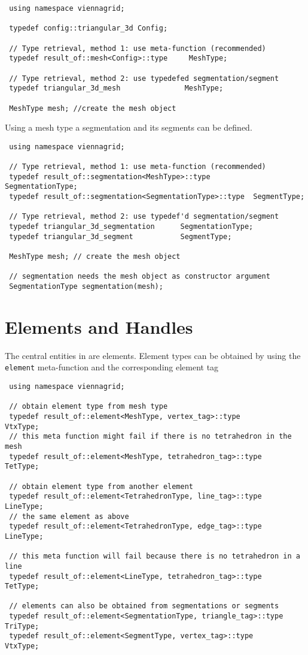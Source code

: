 \begin{lstlisting}
 using namespace viennagrid;

 typedef config::triangular_3d Config;

 // Type retrieval, method 1: use meta-function (recommended)
 typedef result_of::mesh<Config>::type     MeshType;

 // Type retrieval, method 2: use typedefed segmentation/segment
 typedef triangular_3d_mesh               MeshType;

 MeshType mesh; //create the mesh object
\end{lstlisting}

Using a mesh type a segmentation and its segments can be defined.

\begin{lstlisting}
 using namespace viennagrid;

 // Type retrieval, method 1: use meta-function (recommended)
 typedef result_of::segmentation<MeshType>::type        SegmentationType;
 typedef result_of::segmentation<SegmentationType>::type  SegmentType;

 // Type retrieval, method 2: use typedef'd segmentation/segment
 typedef triangular_3d_segmentation      SegmentationType;
 typedef triangular_3d_segment           SegmentType;

 MeshType mesh; // create the mesh object

 // segmentation needs the mesh object as constructor argument
 SegmentationType segmentation(mesh);
\end{lstlisting}

\pagebreak

\section{Elements and Handles} \label{sec:elements-and-handles}

The central entities in {\ViennaGrid} are elements. Element types can be obtained by using the \lstinline|element| meta-function and the corresponding element tag

\begin{lstlisting}
 using namespace viennagrid;

 // obtain element type from mesh type
 typedef result_of::element<MeshType, vertex_tag>::type         VtxType;
 // this meta function might fail if there is no tetrahedron in the mesh
 typedef result_of::element<MeshType, tetrahedron_tag>::type    TetType;

 // obtain element type from another element
 typedef result_of::element<TetrahedronType, line_tag>::type      LineType;
 // the same element as above
 typedef result_of::element<TetrahedronType, edge_tag>::type      LineType;

 // this meta function will fail because there is no tetrahedron in a line
 typedef result_of::element<LineType, tetrahedron_tag>::type      TetType;

 // elements can also be obtained from segmentations or segments
 typedef result_of::element<SegmentationType, triangle_tag>::type TriType;
 typedef result_of::element<SegmentType, vertex_tag>::type        VtxType;
\end{lstlisting}

